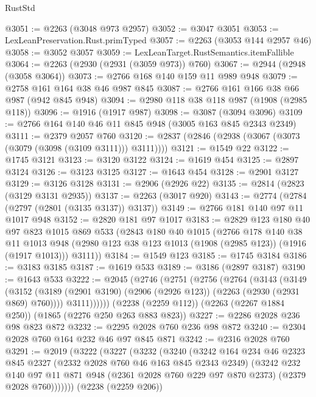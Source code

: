 \begin{lexlean}{RustStd}
\begin{coremodule}
@3051 := @2263 (@3048 @973 @2957)
@3052 := @3047 @3051
@3053 := LexLeanPreservation.Rust.primTyped
@3057 := @2263 (@3053 @144 @2957 @46)
@3058 := @3052 @3057
@3059 := LexLeanTarget.RustSemantics.itemFallible
@3064 := @2263 (@2930 (@2931 (@3059 @973)) @760)
@3067 := @2944 (@2948 (@3058 @3064))
@3073 := @2766 @168 @140 @159 @11 @989 @948
@3079 := @2758 @161 @164 @38 @46 @987 @845
@3087 := @2766 @161 @166 @38 @66 @987 (@942 @845 @948)
@3094 := @2980 @118 @38 @118 @987 (@1908 (@2985 @118))
@3096 := @1916 (@1917 @987)
@3098 := @3087 (@3094 @3096)
@3109 := @2766 @164 @140 @46 @11 @845 @948 (@3005 @163 @845 @2343 @2349)
@3111 := @2379 @2057 @760
@3120 := @2837 (@2846 (@2938 (@3067 (@3073 (@3079 (@3098 (@3109 @3111))) @3111))))
@3121 := @1549 @22
@3122 := @1745 @3121
@3123 := @3120 @3122
@3124 := @1619 @454
@3125 := @2897 @3124
@3126 := @3123 @3125
@3127 := @1643 @454
@3128 := @2901 @3127
@3129 := @3126 @3128
@3131 := @2906 (@2926 @22)
@3135 := @2814 (@2823 (@3129 @3131 @2935))
@3137 := @2263 (@3017 @920)
@3143 := @2774 (@2784 (@2797 (@2801 (@3135 @3137)) @3137))
@3149 := @2766 @181 @140 @97 @11 @1017 @948
@3152 := @2820 @181 @97 @1017
@3183 := @2829
    @123
    @180
    @40
    @97
    @823
    @1015
    @869
    @533
    (@2843
      @180
      @40
      @1015
      (@2766
        @178
        @140
        @38
        @11
        @1013
        @948
        (@2980 @123 @38 @123 @1013 (@1908 (@2985 @123)) (@1916 (@1917 @1013)))
        @3111))
@3184 := @1549 @123
@3185 := @1745 @3184
@3186 := @3183 @3185
@3187 := @1619 @533
@3189 := @3186 (@2897 @3187)
@3190 := @1643 @533
@3222 := @2045
    (@2746
      (@2751
        (@2756
          (@2764
            (@3143
              (@3149
                (@3152 (@3189 (@2901 @3190) (@2906 (@2926 @123)) (@2263 (@2930 (@2931 @869) @760))))
                @3111))))))
    (@2238 (@2259 @112))
    (@2263 (@2267 @1884 @250))
    (@1865 (@2276 @250 @263 @883 @823))
@3227 := @2286 @2028 @236 @98 @823 @872
@3232 := @2295 @2028 @760 @236 @98 @872
@3240 := @2304 @2028 @760 @164 @232 @46 @97 @845 @871
@3242 := @2316 @2028 @760
@3291 := @2019
    (@3222
      (@3227
        (@3232
          (@3240
            (@3242
              @164
              @234
              @46
              @2323
              @845
              @2327
              (@2332 @2028 @760 @46 @163 @845 @2343 @2349)
              (@3242
                @232
                @140
                @97
                @11
                @871
                @948
                (@2361 @2028 @760 @229 @97 @870 @2373)
                (@2379 @2028 @760)))))))
    (@2238 (@2259 @206))

\end{coremodule}
\end{lexlean}
